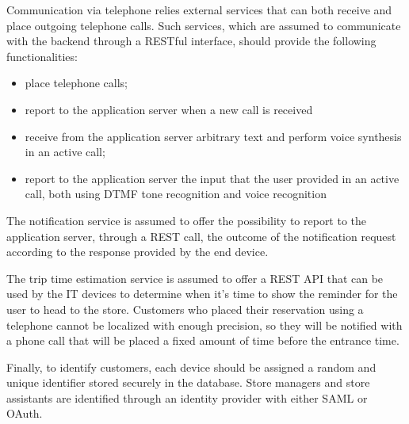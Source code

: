 \documentclass[../../main.tex]{subfiles}
\begin{document}
    Communication via telephone relies external services that can both receive and place outgoing telephone calls. Such services, which are assumed to communicate with the backend through a RESTful interface, should provide the following functionalities:
    \begin{itemize}
        \item place telephone calls;
        \item report to the application server when a new call is received
        \item receive from the application server arbitrary text and perform voice synthesis in an active call;
        \item report to the application server the input that the user provided in an active call, both using DTMF tone recognition and voice recognition
    \end{itemize}

    The notification service is assumed to offer the possibility to report to the application server, through a REST call, the outcome of the notification request according to the response provided by the end device.

    The trip time estimation service is assumed to offer a REST API that can be used by the IT devices to determine when it's time to show the reminder for the user to head to the store. Customers who placed their reservation using a telephone cannot be localized with enough precision, so they will be notified with a phone call that will be placed a fixed amount of time before the entrance time.

    Finally, to identify customers, each device should be assigned a random and unique identifier stored securely in the database. Store managers and store assistants are identified through
    an identity provider with either SAML or OAuth. 
\end{document}
